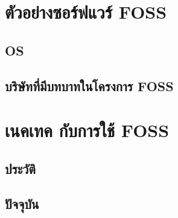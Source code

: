 \documentclass[aspectratio=169,xetex,compress,xcolor={table}]{beamer}
\begin{document}
\section{ตัวอย่างซอร์ฟแวร์ FOSS}
\subsection{OS}


\subsection{บริษัทที่มีบทบาทในโครงการ FOSS}



\section{เนคเทค กับการใช้ FOSS }
\subsection{ประวัติ}


\subsection{ปัจจุบัน}

\end{document}
